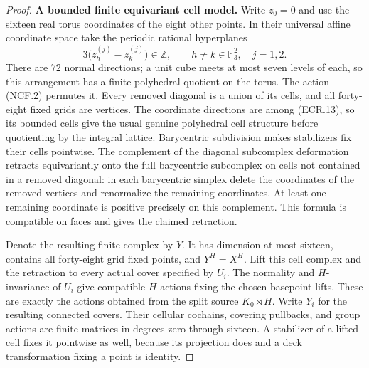\begin{proof}
\par\medskip\noindent\textbf{A bounded finite equivariant cell model.}\quad
Write $z_0=0$ and use the sixteen real torus coordinates of the eight
other points.  In their universal affine coordinate space take the
periodic rational hyperplanes
\[
 3\bigl(z_h^{(j)}-z_k^{(j)}\bigr)\in\mathbb Z,
       \qquad h\ne k\in\mathbb F_3^2,\quad j=1,2.
                                                               \tag{ECR.13}
\]
There are $72$ normal directions; a unit cube meets at most seven
levels of each, so this arrangement has a finite polyhedral quotient
on the torus.  The action (NCF.2) permutes it.  Every removed diagonal
is a union of its cells, and all forty-eight fixed grids are vertices.
The coordinate directions are among (ECR.13), so its bounded cells
give the usual genuine polyhedral cell structure before quotienting
by the integral lattice.  Barycentric subdivision makes stabilizers
fix their cells pointwise.  The complement of the diagonal subcomplex
deformation retracts equivariantly onto the full barycentric
subcomplex on cells not contained in a removed diagonal: in each
barycentric simplex delete the coordinates of the removed vertices
and renormalize the remaining coordinates.  At least one remaining
coordinate is positive precisely on this complement.  This formula
is compatible on faces and gives the claimed retraction.

Denote the resulting finite complex by $Y$.  It has dimension at
most sixteen, contains all forty-eight grid fixed points, and
$Y^H=X^H$.  Lift this cell complex and the retraction to every actual
cover specified by $U_i$.  The normality and $H$-invariance of $U_i$
give compatible $H$ actions fixing the chosen basepoint lifts.
These are exactly the actions obtained from the split source
$K_0\rtimes H$.  Write $Y_i$ for the resulting connected covers.
Their cellular cochains, covering pullbacks, and group actions are
finite matrices in degrees zero through sixteen.  A stabilizer of a
lifted cell fixes it pointwise as well, because its projection does
and a deck transformation fixing a point is identity.


\end{proof}
